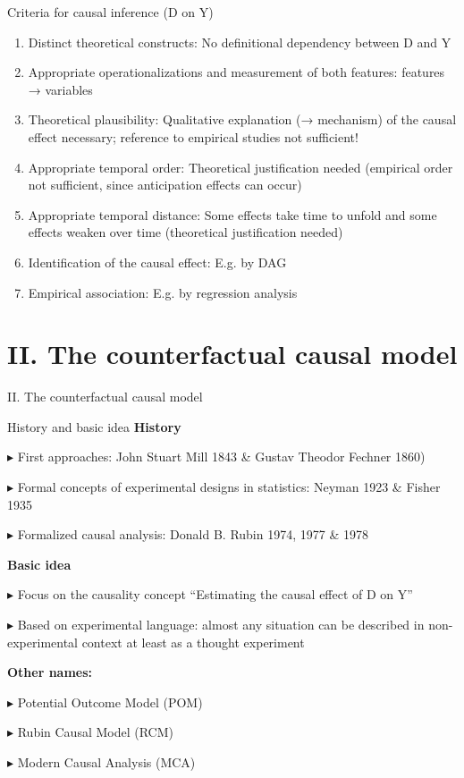 \documentclass[
  ignorenonframetext,
]{beamer}
\providecommand{\tightlist}{%
  \setlength{\itemsep}{0pt}\setlength{\parskip}{0pt}}
\begin{document}
\begin{frame}{Criteria for causal inference (D on Y)}
\protect\hypertarget{criteria-for-causal-inference-d-on-y}{}
\begin{enumerate}
\tightlist
\item
  Distinct theoretical constructs: No definitional dependency between D
  and Y
\item
  Appropriate operationalizations and measurement of both features:
  features → variables
\item
  Theoretical plausibility: Qualitative explanation (→ mechanism) of the
  causal effect necessary; reference to empirical studies not
  sufficient!
\item
  Appropriate temporal order: Theoretical justification needed
  (empirical order not sufficient, since anticipation effects can occur)
\item
  Appropriate temporal distance: Some effects take time to unfold and
  some effects weaken over time (theoretical justification needed)
\item
  Identification of the causal effect: E.g. by DAG
\item
  Empirical association: E.g. by regression analysis
\end{enumerate}
\end{frame}

\hypertarget{ii.-the-counterfactual-causal-model}{%
\section{II. The counterfactual causal
model}\label{ii.-the-counterfactual-causal-model}}

\begin{frame}{II. The counterfactual causal model}
\end{frame}

\begin{frame}{History and basic idea}
\protect\hypertarget{history-and-basic-idea}{}
\textbf{History}

▸ First approaches: John Stuart Mill 1843 \& Gustav Theodor Fechner
1860)

▸ Formal concepts of experimental designs in statistics: Neyman 1923 \&
Fisher 1935

▸ Formalized causal analysis: Donald B. Rubin 1974, 1977 \& 1978

\textbf{Basic idea}

▸ Focus on the causality concept ``Estimating the causal effect of D on
Y''

▸ Based on experimental language: almost any situation can be described
in non-experimental context at least as a thought experiment

\textbf{Other names:}

▸ Potential Outcome Model (POM)

▸ Rubin Causal Model (RCM)

▸ Modern Causal Analysis (MCA)
\end{frame}
\end{document}
